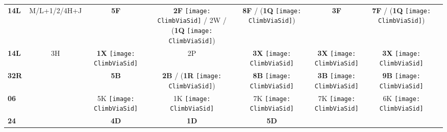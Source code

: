 \documentclass[10pt,landscape,a4paper]{article}
\begin{document}
\begin{textblock}{40}
\begin{table}[]
\begin{tabular}{lccccccc}
\multicolumn{1}{|l|}{\textbf{14L}} & 
\multicolumn{1}{c|}{M/L+1/2/4H+J} & 
\multicolumn{1}{c|}{\textbf{5F}} & 
\multicolumn{1}{c||}{\textbf{2F} \texttt{[image: ClimbViaSid]} / 2W / (\textbf{1Q} \texttt{[image: ClimbViaSid]})} & 
\multicolumn{1}{c|}{\textbf{8F} / (\textbf{1Q} \texttt{[image: ClimbViaSid]})} & 
\multicolumn{1}{c|}{\textbf{3F}} & 
\multicolumn{1}{c|}{\textbf{7F} / (\textbf{1Q} \texttt{[image: ClimbViaSid]})} & 
\multicolumn{1}{c|}{} \\ \cline{1-7}
\multicolumn{1}{|l|}{\textbf{14L}} & 
\multicolumn{1}{c|}{3H} & 
\multicolumn{1}{c|}{\textbf{1X} \texttt{[image: ClimbViaSid]}} & 
\multicolumn{1}{c||}{2P} & 
\multicolumn{1}{c|}{\textbf{3X} \texttt{[image: ClimbViaSid]}} & 
\multicolumn{1}{c|}{\textbf{3X} \texttt{[image: ClimbViaSid]}} & 
\multicolumn{1}{c|}{\textbf{3X} \texttt{[image: ClimbViaSid]}} & 
\multicolumn{1}{c|}{} \\ \cline{1-7}
\multicolumn{1}{|l|}{\textbf{32R}} & 
\multicolumn{1}{c|}{} & 
\multicolumn{1}{c|}{\textbf{5B}} & 
\multicolumn{1}{c||}{\textbf{2B} / (\textbf{1R} \texttt{[image: ClimbViaSid]})} & 
\multicolumn{1}{c|}{\textbf{8B} \texttt{[image: ClimbViaSid]}} & 
\multicolumn{1}{c|}{\textbf{3B} \texttt{[image: ClimbViaSid]}} & 
\multicolumn{1}{c|}{\textbf{9B} \texttt{[image: ClimbViaSid]}} & 
\multicolumn{1}{c|}{} \\ \cline{1-7}
\multicolumn{1}{|l|}{\textbf{06}} & 
\multicolumn{1}{c|}{} & 
\multicolumn{1}{c|}{5K \texttt{[image: ClimbViaSid]}} & 
\multicolumn{1}{c||}{1K \texttt{[image: ClimbViaSid]}} & 
\multicolumn{1}{c|}{7K \texttt{[image: ClimbViaSid]}} & 
\multicolumn{1}{c|}{7K \texttt{[image: ClimbViaSid]}} & 
\multicolumn{1}{c|}{6K \texttt{[image: ClimbViaSid]}} & 
\multicolumn{1}{c|}{} \\ \cline{1-7}
\multicolumn{1}{|l|}{\textbf{24}} & 
\multicolumn{1}{c|}{} & 
\multicolumn{1}{c|}{\textbf{4D}} & 
\multicolumn{1}{c||}{\textbf{1D}} & 
\multicolumn{1}{c|}{\textbf{5D}} & 

\end{tabular}
\end{table}
\end{textblock}
\end{document}
